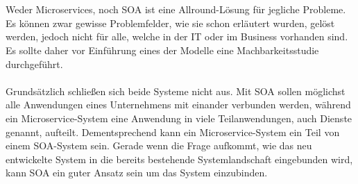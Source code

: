 \\\\
Weder Microservices, noch SOA ist eine Allround-Lösung für jegliche Probleme. Es können zwar gewisse Problemfelder, wie sie schon erläutert wurden, gelöst werden, jedoch nicht für alle, welche in der IT oder im Business vorhanden sind. Es sollte daher vor Einführung eines der Modelle eine Machbarkeitsstudie durchgeführt.
\\\\
Grundsätzlich schließen sich beide Systeme nicht aus. Mit SOA sollen möglichst alle Anwendungen eines Unternehmens mit einander verbunden werden, während ein Microservice-System eine Anwendung in viele Teilanwendungen, auch Dienste genannt, aufteilt. Dementsprechend kann ein Microservice-System ein Teil von einem SOA-System sein. Gerade wenn die Frage aufkommt, wie das neu entwickelte System in die bereits bestehende Systemlandschaft eingebunden wird, kann SOA ein guter Ansatz sein um das System einzubinden.